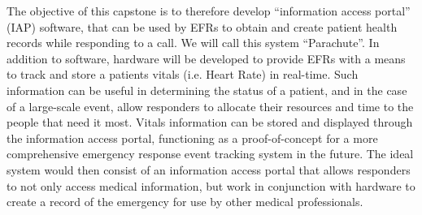 \iffalse The objective of this Capstone Project is to therefore develop an information management system that stores health records for access by patients, and their healthcare providers. \fi The objective of this capstone is to therefore develop ``information access portal'' (IAP) software, that can be used by EFRs to obtain and create patient health records while responding to a call. We will call this system ``Parachute''. In addition to software, hardware will be developed to provide EFRs with a means to track and store a patients vitals (i.e. Heart Rate) in real-time. Such information can be useful in determining the status of a patient, and in the case of a large-scale event, allow responders to allocate their resources and time to the people that need it most. Vitals information can be stored and displayed through the information access portal, functioning as a proof-of-concept for a more comprehensive emergency response event tracking system in the future. The ideal system would then consist of an information access portal that allows responders to not only access medical information, but work in conjunction with hardware to create a record of the emergency for use by other medical professionals.
